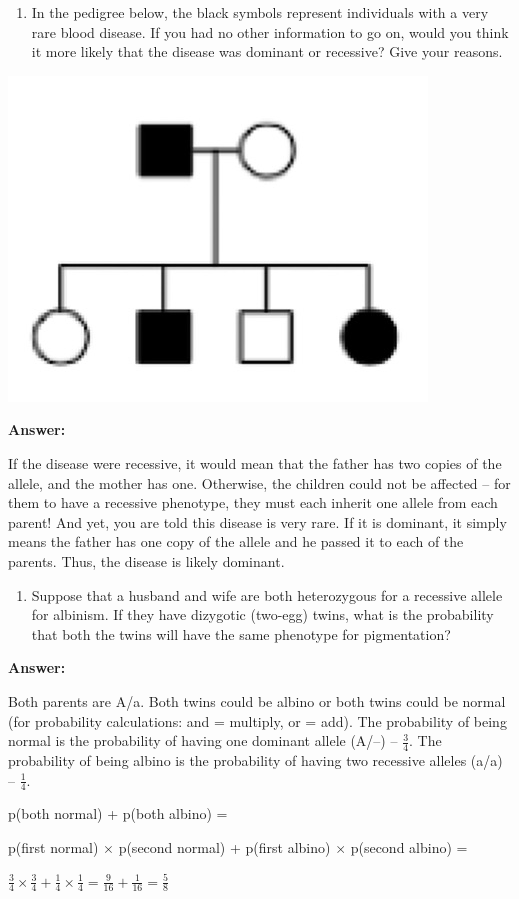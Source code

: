 \documentclass[11pt,]{article}
\providecommand{\tightlist}{%
  \setlength{\itemsep}{0pt}\setlength{\parskip}{0pt}}
\begin{document}
\begin{blackbox}

\begin{enumerate}
\def\labelenumi{\arabic{enumi}.}
\setcounter{enumi}{42}
\tightlist
\item
  In the pedigree below, the black symbols represent individuals with a
  very rare blood disease. If you had no other information to go on,
  would you think it more likely that the disease was dominant or
  recessive? Give your reasons.
\end{enumerate}

\begin{center}\includegraphics[width=0.35\linewidth,]{input/43pedigree} \end{center}

\textbf{Answer:}

If the disease were recessive, it would mean that the father has two
copies of the allele, and the mother has one. Otherwise, the children
could not be affected -- for them to have a recessive phenotype, they
must each inherit one allele from each parent! And yet, you are told
this disease is very rare. If it is dominant, it simply means the father
has one copy of the allele and he passed it to each of the parents.
Thus, the disease is likely dominant.

\end{blackbox}

\begin{blackbox}

\begin{enumerate}
\def\labelenumi{\arabic{enumi}.}
\setcounter{enumi}{45}
\tightlist
\item
  Suppose that a husband and wife are both heterozygous for a recessive
  allele for albinism. If they have dizygotic (two-egg) twins, what is
  the probability that both the twins will have the same phenotype for
  pigmentation?
\end{enumerate}

\textbf{Answer:}

Both parents are A/a. Both twins could be albino or both twins could be
normal (for probability calculations: and = multiply, or = add). The
probability of being normal is the probability of having one dominant
allele (A/--) -- \(\frac{3}{4}\). The probability of being albino is the
probability of having two recessive alleles (a/a) -- \(\frac{1}{4}\).

p(both normal) + p(both albino) =

p(first normal) \(\times\) p(second normal) + p(first albino) \(\times\)
p(second albino) =

\(\frac{3}{4} \times \frac{3}{4} + \frac{1}{4} \times \frac{1}{4} = \frac{9}{16} + \frac{1}{16} = \frac{5}{8}\)

\end{blackbox}
\end{document}
